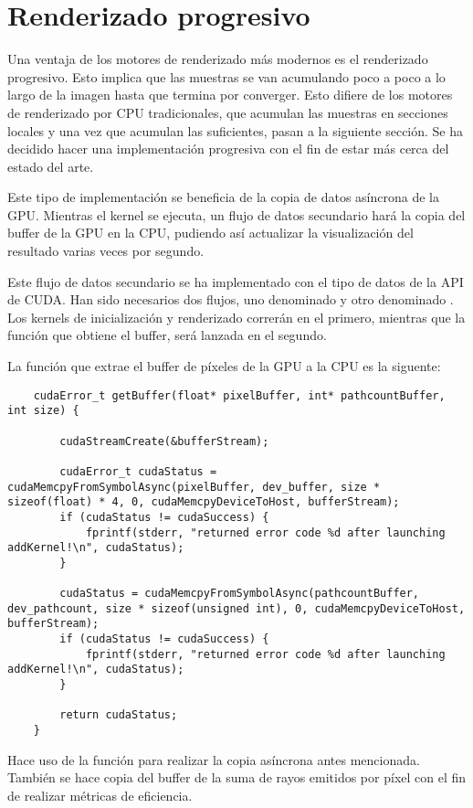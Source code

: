 \section{Renderizado progresivo}
		
	Una ventaja de los motores de renderizado más modernos es el renderizado progresivo. Esto implica que las muestras se van acumulando poco a poco a lo largo de la imagen hasta que termina por converger. Esto difiere de los motores de renderizado por CPU tradicionales, que acumulan las muestras en secciones locales y una vez que acumulan las suficientes, pasan a la siguiente sección. Se ha decidido hacer una implementación progresiva con el fin de estar más cerca del estado del arte.
	
	Este tipo de implementación se beneficia de la copia de datos asíncrona de la GPU. Mientras el kernel se ejecuta, un flujo de datos secundario hará la copia del buffer de la GPU en la CPU, pudiendo así actualizar la visualización del resultado varias veces por segundo.

	Este flujo de datos secundario se ha implementado con el tipo de datos  de la API de CUDA. Han sido necesarios dos flujos, uno denominado  y otro denominado . Los kernels de inicialización y renderizado correrán en el primero, mientras que la función que obtiene el buffer, será lanzada en el segundo.
	
	La función que extrae el buffer de píxeles de la GPU a la CPU es la siguente:
	
	\begin{lstlisting}
	cudaError_t getBuffer(float* pixelBuffer, int* pathcountBuffer, int size) {

		cudaStreamCreate(&bufferStream);

		cudaError_t cudaStatus = cudaMemcpyFromSymbolAsync(pixelBuffer, dev_buffer, size * sizeof(float) * 4, 0, cudaMemcpyDeviceToHost, bufferStream);
		if (cudaStatus != cudaSuccess) {
			fprintf(stderr, "returned error code %d after launching addKernel!\n", cudaStatus);
		}

		cudaStatus = cudaMemcpyFromSymbolAsync(pathcountBuffer, dev_pathcount, size * sizeof(unsigned int), 0, cudaMemcpyDeviceToHost, bufferStream);
		if (cudaStatus != cudaSuccess) {
			fprintf(stderr, "returned error code %d after launching addKernel!\n", cudaStatus);
		}

		return cudaStatus;
	}
	\end{lstlisting}
	
	Hace uso de la función  para realizar la copia asíncrona antes mencionada. También se hace copia del buffer de la suma de rayos emitidos por píxel con el fin de realizar métricas de eficiencia.
	


	











